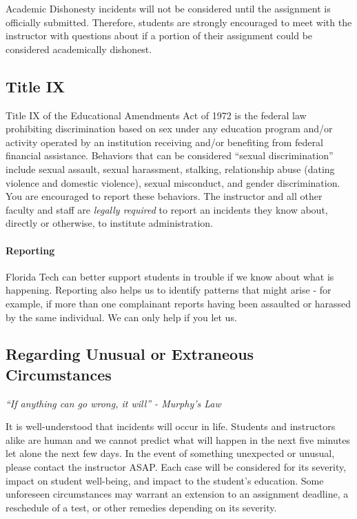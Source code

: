 \documentclass[
	letterpaper, %
	fontsize=10pt, %
	twoside=true, %
	numbers=noenddot, %
]{kaobook}
\begin{document}
Academic Dishonesty incidents will not be considered until the assignment is officially submitted. 
Therefore, students are strongly encouraged to meet with the instructor with questions about if a portion of their assignment could be considered academically dishonest.

\subsection*{Title IX} \label{ssec:title_ix}
Title IX of the Educational Amendments Act of 1972 is the federal law prohibiting discrimination based on sex under any education program and/or activity operated by an institution receiving and/or benefiting from federal financial assistance. Behaviors that can be considered “sexual discrimination” include sexual assault, sexual harassment, stalking, relationship abuse (dating violence and domestic violence), sexual misconduct, and gender discrimination. You are encouraged to report these behaviors. The instructor and all other faculty and staff are \emph{legally required} to report an incidents they know about, directly or otherwise, to institute administration.

\paragraph*{Reporting} Florida Tech can better support students in trouble if we know about what is happening.  Reporting also helps us to identify patterns that might arise - for example, if more than one complainant reports having been assaulted or harassed by the same individual. We can only help if you let us.

\subsection*{Regarding Unusual or Extraneous Circumstances} \label{ssec:unusual_circumstances}
\emph{``If anything can go wrong, it will'' - Murphy's Law}

It is well-understood that incidents will occur in life.
Students and instructors alike are human and we cannot predict what will happen in the next five minutes let alone the next few days.
In the event of something unexpected or unusual, please contact the instructor ASAP.
Each case will be considered for its severity, impact on student well-being, and impact to the student's education.
Some unforeseen circumstances may warrant an extension to an assignment deadline, a reschedule of a test, or other remedies depending on its severity.
\end{document}
